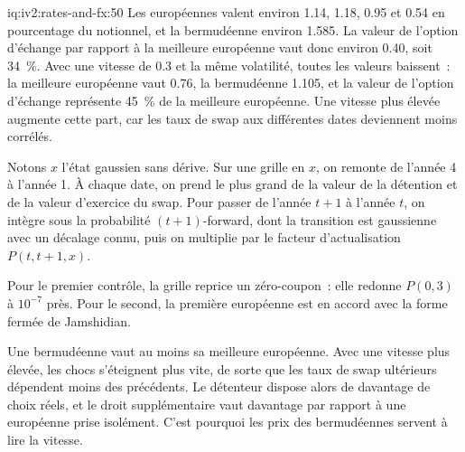 \begin{solution}{iq:iv2:rates-and-fx:50}
Les européennes valent environ 1.14, 1.18, 0.95 et 0.54 en pourcentage du notionnel, et la bermudéenne environ 1.585. La valeur de l'option d'échange par rapport à la meilleure européenne vaut donc environ 0.40, soit 34~\%. Avec une vitesse de 0.3 et la même volatilité, toutes les valeurs baissent~: la meilleure européenne vaut 0.76, la bermudéenne 1.105, et la valeur de l'option d'échange représente 45~\% de la meilleure européenne. Une vitesse plus élevée augmente cette part, car les taux de swap aux différentes dates deviennent moins corrélés.

Notons $x$ l'état gaussien sans dérive. Sur une grille en $x$, on remonte de l'année 4 à l'année 1. À chaque date, on prend le plus grand de la valeur de la détention et de la valeur d'exercice du swap. Pour passer de l'année $t + 1$ à l'année $t$, on intègre sous la probabilité $(t + 1)$-forward, dont la transition est gaussienne avec un décalage connu, puis on multiplie par le facteur d'actualisation $P(t, t + 1, x)$.

Pour le premier contrôle, la grille reprice un zéro-coupon~: elle redonne $P(0, 3)$ à $10^{-7}$ près. Pour le second, la première européenne est en accord avec la forme fermée de Jamshidian.

Une bermudéenne vaut au moins sa meilleure européenne. Avec une vitesse plus élevée, les chocs s'éteignent plus vite, de sorte que les taux de swap ultérieurs dépendent moins des précédents. Le détenteur dispose alors de davantage de choix réels, et le droit supplémentaire vaut davantage par rapport à une européenne prise isolément. C'est pourquoi les prix des bermudéennes servent à lire la vitesse.

\end{solution}
